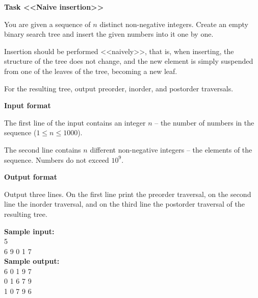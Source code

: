 \documentclass[a4paper]{article}
\begin{document}
\textbf{Task <<Naive insertion>>}

You are given a sequence of $n$ distinct non-negative integers. Create an empty binary search tree and insert the given numbers into it one by one.

Insertion should be performed <<naively>>, that is, when inserting, the structure of the tree does not change, and the new element is simply suspended from one of the leaves of the tree, becoming a new leaf.

For the resulting tree, output preorder, inorder, and postorder traversals.

\SPACE

\textbf{Input format}

The first line of the input contains an integer $n$ -- the number of numbers in the sequence ($1 \le n \le 1000$).

The second line contains $n$ different non-negative integers -- the elements of the sequence. Numbers do not exceed $10^9$.

\SPACE

\textbf{Output format}

Output three lines. On the first line print the preorder traversal, on the second line the inorder traversal, and on the third line the postorder traversal of the resulting tree.

\LINE

\noindent \textbf{Sample input:}\\
5\\
6 9 0 1 7\\

\noindent \textbf{Sample output:}\\
6 0 1 9 7\\
0 1 6 7 9\\
1 0 7 9 6\\
\end{document}
